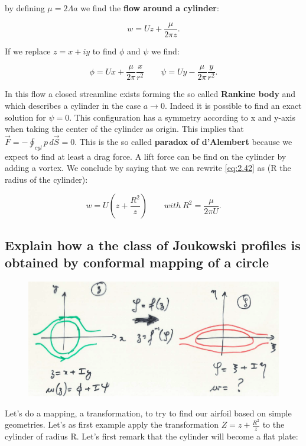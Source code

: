 \documentclass[british,french,11pt, a4paper, openany]{article}
\begin{document}
by defining $\mu = 2\Lambda a$ we find the \textbf{flow around a cylinder}:

\begin{equation}
w = Uz + \frac{\mu }{2\pi z}.
\label{eq:2.42}
\end{equation}

If we replace $z= x+iy$ to find $\phi$ and $\psi$ we find:

\begin{equation}
\phi = Ux + \frac{\mu}{2\pi }\frac{x}{r^2} \qquad \psi = Uy - \frac{\mu }{2\pi} \frac{y}{r^2}.
\end{equation}

In this flow a closed streamline exists forming the so called \textbf{Rankine body} and which describes a cylinder in the case $a\rightarrow 0$. Indeed it is possible to find an exact solution for $\psi = 0$. This configuration has a symmetry according to x and y-axis when taking the center of the cylinder as origin. This implies that $\vec{F} = - \oint _{cyl} p\, d\vec{S} = 0$. This is the so called \textbf{paradox of d'Alembert} because we expect to find at least a drag force. A lift force can be find on the cylinder by adding a vortex. We conclude by saying that we can rewrite \eqref{eq:2.42} as (R the radius of the cylinder):

\begin{equation}
w = U\left( z + \frac{R^2}{z} \right) \qquad with \ R^2 = \frac{\mu }{2\pi U}.
\end{equation}

\subsection{Explain how a the class of Joukowski profiles is obtained by conformal mapping of a circle}
\begin{figure}
	\vspace{-5mm}
	\includegraphics[scale=0.1]{ch2/28}
\end{figure}
Let's do a mapping, a transformation, to try to find our airfoil based on simple geometries. Let's as first example apply the transformation $Z = z + \frac{R^2}{z}$ to the cylinder of radius R. Let's first remark that the cylinder will become a flat plate:
\end{document}
